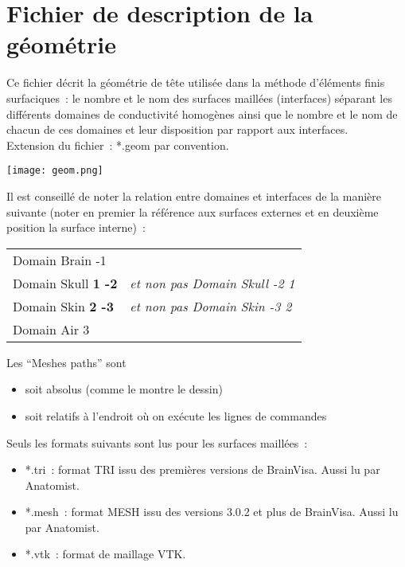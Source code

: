 \section{Fichier de description de la géométrie}
\label{sec:geom}

\noindent
Ce fichier décrit la géométrie de tête utilisée dans la méthode d'éléments finis surfaciques~: le nombre et le nom des surfaces maillées (interfaces) séparant les différents domaines de
conductivité homogènes ainsi que le nombre et le nom de chacun de ces domaines et leur disposition par rapport aux interfaces.\\
Extension du fichier~: *.geom par convention.

\centerline{\texttt{[image: geom.png]}}

\begin{note}
    Il est conseillé de noter la relation entre domaines et interfaces de la manière
    suivante (noter en premier la référence aux surfaces externes et en deuxième position la surface interne)~:

    \begin{tabular}{ll}
        Domain Brain -1              & \\
        Domain Skull \textbf{1 -2}	 &	\emph{et non pas Domain Skull -2 1} \\
        Domain Skin \textbf{2 -3}	 &	\emph{et non pas Domain Skin -3 2}  \\
        Domain Air 3                 &  \\
    \end{tabular}
\end{note}

\medskip

\begin{note}
    Les ``Meshes paths'' sont
    \begin{itemize}
        \item soit absolus (comme le montre le dessin)
        \item soit relatifs à l'endroit où on exécute les lignes de commandes
    \end{itemize}
    Seuls les formats suivants sont lus pour les surfaces maillées~:
    \begin{itemize}
        \item *.tri~: format TRI issu des premières versions de BrainVisa. Aussi lu par Anatomist.
        \item *.mesh~: format MESH issu des versions 3.0.2 et plus de BrainVisa. Aussi lu par Anatomist.
        \item *.vtk~: format de maillage VTK.
    \end{itemize}
\end{note}

